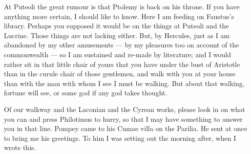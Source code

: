 

 At Puteoli the great rumour is that Ptolemy is back on his throne. If you have anything more certain, I should like to know. Here I am feeding on Faustus's library. Perhaps you supposed it would be on the things at Puteoli and the Lucrine. Those things are not lacking either. But, by Hercules, just as I am abandoned by my other amusements --- by my pleasures too on account of the commonwealth --- so I am sustained and re-made by literature; and I would rather sit in that little chair of yours that you have under the bust of Aristotle than in the curule chair of those gentlemen, and walk with you at your house than with the man with whom I see I must be walking. But about that walking, fortune will see, or some god if any god takes thought.

 Of our walkway and the Laconian and the Cyrean works, please look in on what you can and press Philotimus to hurry, so that I may have something to answer you in that line. Pompey came to his Cumae villa on the Parilia. He sent at once to bring me his greetings. To him I was setting out the morning after, when I wrote this.
